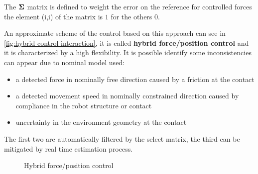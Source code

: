 The $\boldsymbol{\Sigma}$ matrix is defined to weight the error on the reference for controlled forces the element (i,i) of the matrix is $1$ for the others $0$.

An approximate scheme of the control based on this approach can see in \autoref{fig:hybrid-control-interaction}, it is called \textbf{hybrid force/position control} and it is characterized by a high flexibility.
It is possible identify some inconsistencies can appear due to nominal model used:

\begin{itemize}
	\item a detected force in nominally free direction caused by a friction at the contact
	\item a detected movement speed in nominally constrained direction caused by compliance in the robot structure or contact
	\item uncertainty in the environment geometry at the contact
\end{itemize}

The first two are automatically filtered by the select matrix, the third can be mitigated by real time estimation process.

\begin{figure}[htb]
	\centering
	\caption{Hybrid force/position control}
	\label{fig:hybrid-control-interaction}
\end{figure}

